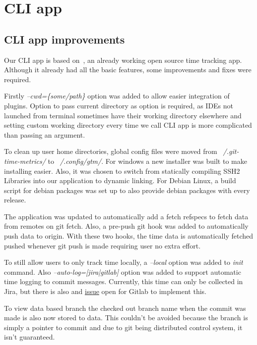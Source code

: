 \section{CLI app}\label{sec:cli-app-contents}

\subsection{CLI app improvements}\label{subsec:cli-app-improvements}
Our CLI app is based on~, an already working open source time tracking app.
Although it already had all the basic features, some improvements and fixes were required.

Firstly \textit{--cwd=\{some/path\}} option was added to allow easier integration of plugins.
Option to pass current directory as option is required, as IDEs not launched from terminal sometimes have their working
directory elsewhere and setting custom working directory every time we call CLI app is more complicated than passing an argument.

To clean up user home directories, global config files were moved from \textit{~/.git-time-metrics/} to \textit{~/.config/gtm/}.
For windows a new installer was built to make installing easier.
Also, it was chosen to switch from statically compiling SSH2 Libraries into our application to dynamic linking.
For Debian Linux, a build script for debian packages was set up to also provide debian packages with every release.

The application was updated to automatically add a fetch refspecs to fetch data from remotes on git fetch.
Also, a pre-push git hook was added to automatically push data to origin.
With these two hooks, the time data is automatically fetched pushed whenever git push is made requiring user no extra effort.

To still allow users to only track time locally, a \textit{--local} option was added to \textit{init} command.
Also \textit{--auto-log=[jira|gitlab]} option was added to support automatic time logging to commit messages.
Currently, this time can only be collected in Jira, but there is also and \href{https://gitlab.com/gitlab-org/gitlab/-/issues/16543}{issue}
open for Gitlab to implement this.\cite{gitlab-time-issue}

To view data based branch the checked out branch name when the commit was made is also now stored to data.
This couldn't be avoided because the branch is simply a pointer to commit and due to git being distributed control system,
it isn't guaranteed.


